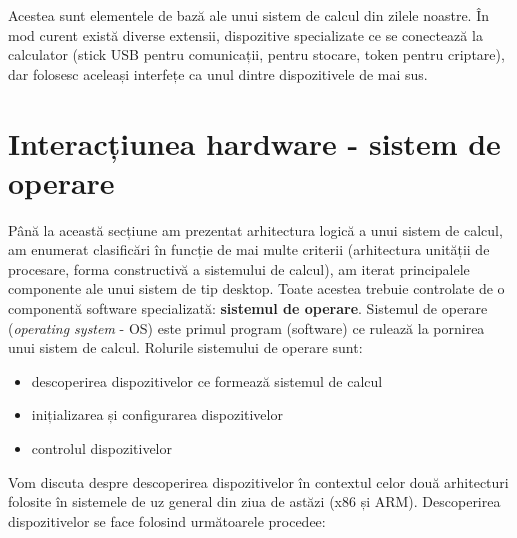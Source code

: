 Acestea sunt elementele de bază ale unui sistem de calcul din zilele noastre. În
mod curent există diverse extensii, dispozitive specializate ce se conectează la
calculator (stick USB pentru comunicații, pentru stocare, token pentru
criptare), dar folosesc aceleași interfețe ca unul dintre dispozitivele de mai sus.

\section{Interacțiunea hardware - sistem de operare}
\label{sec:hw:os-interact}

Până la această secțiune am prezentat arhitectura logică a unui sistem de
calcul, am enumerat clasificări în funcție de mai multe criterii (arhitectura
unității de procesare, forma constructivă a sistemului de calcul), am iterat
principalele componente ale unui sistem de tip desktop. Toate acestea trebuie
controlate de o componentă software specializată: \textbf{sistemul de operare}.
Sistemul de operare (\textit{operating system} - OS) este primul program
(software) ce rulează la pornirea unui sistem de calcul. Rolurile sistemului de
operare sunt:

\begin{itemize}
	\item descoperirea dispozitivelor ce formează sistemul de calcul
	\item inițializarea și configurarea dispozitivelor
	\item controlul dispozitivelor
\end{itemize}

Vom discuta despre descoperirea dispozitivelor în contextul celor două
arhitecturi folosite în sistemele de uz general din ziua de astăzi (x86 și ARM).
Descoperirea dispozitivelor se face folosind următoarele procedee:

